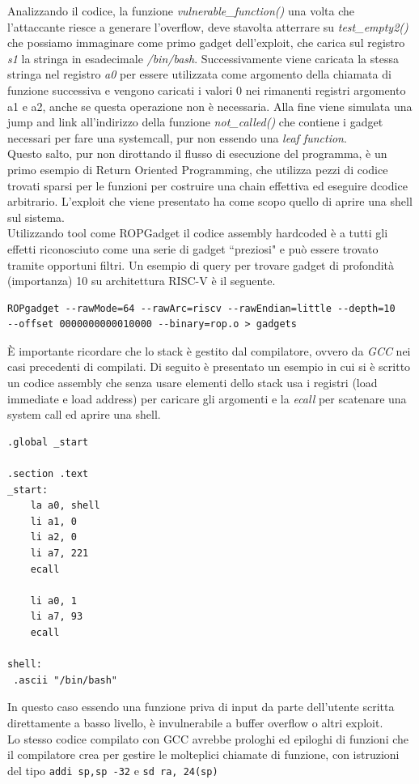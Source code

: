 Analizzando il codice, la funzione \textit{vulnerable\_function()} una volta che l'attaccante riesce a generare l'overflow, deve stavolta atterrare su \textit{test\_empty2()} che possiamo immaginare come primo gadget dell'exploit, che carica sul registro \textit{s1} la stringa in esadecimale \textit{/bin/bash}. Successivamente viene caricata la stessa stringa nel registro \textit{a0} per essere utilizzata come argomento della chiamata di funzione successiva e vengono caricati i valori 0 nei rimanenti registri argomento a1 e a2, anche se questa operazione non è necessaria. Alla fine viene simulata una jump and link all'indirizzo della funzione \textit{not\_called()} che contiene i gadget necessari per fare una systemcall, pur non essendo una \textit{leaf function}.\\
\newline
Questo salto, pur non dirottando il flusso di esecuzione del programma, è un primo esempio di Return Oriented Programming, che utilizza pezzi di codice trovati sparsi per le funzioni per costruire una chain effettiva ed eseguire dcodice arbitrario. L'exploit che viene presentato ha come scopo quello di aprire una shell sul sistema.\\
\newline
Utilizzando tool come ROPGadget il codice assembly hardcoded è a tutti gli effetti riconosciuto come una serie di gadget ``preziosi" e può essere trovato tramite opportuni filtri. Un esempio di query per trovare gadget di profondità (importanza) 10 su architettura RISC-V è il seguente.
\begin{verbatim}
ROPgadget --rawMode=64 --rawArc=riscv --rawEndian=little --depth=10 
--offset 0000000000010000 --binary=rop.o > gadgets
\end{verbatim}
È importante ricordare che lo stack è gestito dal compilatore, ovvero da \textit{GCC} nei casi precedenti di compilati. Di seguito è presentato un esempio in cui si è scritto un codice assembly che senza usare elementi dello stack usa i registri (load immediate e load address) per caricare gli argomenti e la \textit{ecall} per scatenare una system call ed aprire una shell. 
\begin{verbatim}
.global _start

.section .text
_start:
	la a0, shell
	li a1, 0
	li a2, 0
	li a7, 221
	ecall 

	li a0, 1
	li a7, 93
	ecall

shell:
 .ascii "/bin/bash"
\end{verbatim}
 In questo caso essendo una funzione priva di input da parte dell'utente scritta direttamente a basso livello, è invulnerabile a buffer overflow o altri exploit.\\
 Lo stesso codice compilato con GCC avrebbe prologhi ed epiloghi di funzioni che il compilatore crea per gestire le molteplici chiamate di funzione, con istruzioni del tipo \texttt{addi sp,sp -32} e \texttt{sd ra, 24(sp)}
